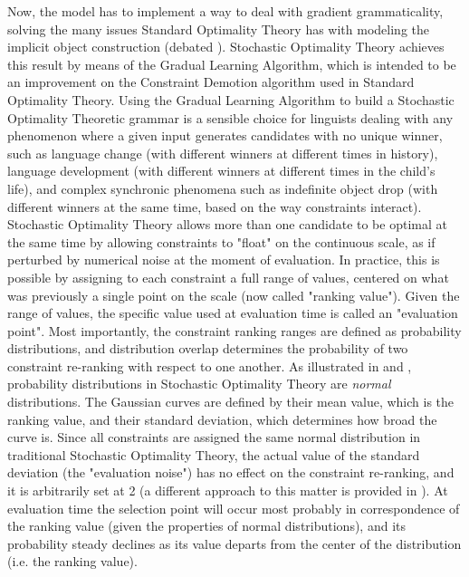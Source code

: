 Now, the model has to implement a way to deal with gradient grammaticality, solving the many issues Standard Optimality Theory has with modeling the implicit object construction (debated ). Stochastic Optimality Theory achieves this result by means of the Gradual Learning Algorithm, which is intended to be an improvement on the Constraint Demotion algorithm \parencite{TesarSmolensky1993learnability} used in Standard Optimality Theory. Using the Gradual Learning Algorithm to build a Stochastic Optimality Theoretic grammar is a sensible choice for linguists dealing with any phenomenon where a given input generates candidates with no unique winner, such as language change (with different winners at different times in history), language development (with different winners at different times in the child's life), and complex synchronic phenomena such as indefinite object drop (with different winners at the same time, based on the way constraints interact).\\
Stochastic Optimality Theory allows more than one candidate to be optimal at the same time by allowing constraints to "float" on the continuous scale, as if perturbed by numerical noise at the moment of evaluation. In practice, this is possible by assigning to each constraint a full range of values, centered on what was previously a single point on the scale (now called "ranking value"). Given the range of values, the specific value used at evaluation time is called an "evaluation point". Most importantly, the constraint ranking ranges are defined as probability distributions, and distribution overlap determines the probability of two constraint re-ranking with respect to one another. As illustrated in  and , probability distributions in Stochastic Optimality Theory are \textit{normal} distributions. The Gaussian curves are defined by their mean value, which is the ranking value, and their standard deviation, which determines how broad the curve is. Since all constraints are assigned the same normal distribution in traditional Stochastic Optimality Theory, the actual value of the standard deviation (the "evaluation noise") has no effect on the constraint re-ranking, and it is arbitrarily set at 2 (a different approach to this matter is provided in \textcite{reynolds1994variation, nagy1997optimality}). At evaluation time the selection point will occur most probably in correspondence of the ranking value (given the properties of normal distributions), and its probability steady declines as its value departs from the center of the distribution (i.e. the ranking value).\\
